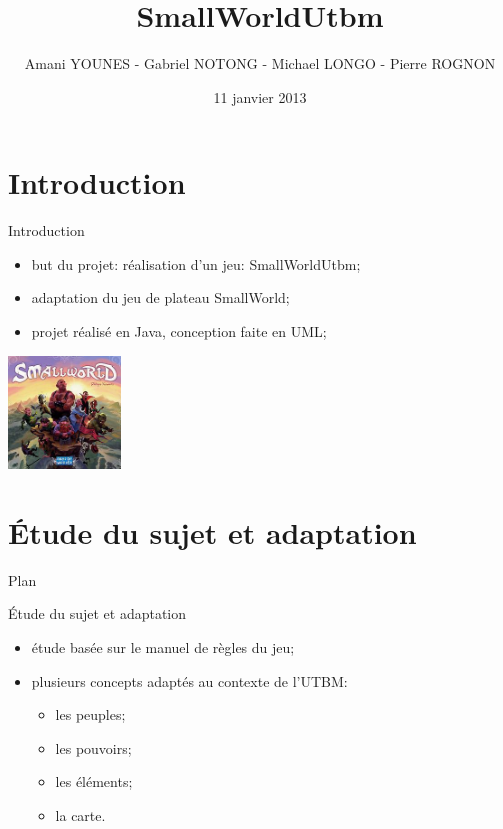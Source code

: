 \documentclass{beamer}
\title[SWU]{SmallWorldUtbm}
\author[]{Amani YOUNES - Gabriel NOTONG - Michael LONGO - Pierre ROGNON}
\institute{Programmation orientée objet - LO43}
\date{11 janvier 2013}
\begin{document}



\begin{frame}
\titlepage
\end{frame}

\section*{Introduction}

\begin{frame}{Introduction}
	
	\begin{itemize}
		\item but du projet: réalisation d'un jeu: SmallWorldUtbm;
		\vspace*{0.3cm}
		\item adaptation du jeu de plateau SmallWorld;
		\vspace*{0.3cm}
		\item projet réalisé en Java, conception faite en UML;
		\vspace*{0.3cm}
	\end{itemize}
	
	\begin{center}
		\includegraphics[width=3cm]{smallworld.jpg}
	\end{center}
\end{frame}

\section{Étude du sujet et adaptation}

\begin{frame}{Plan}

	\tableofcontents

\end{frame}

\begin{frame}{Étude du sujet et adaptation}

	\begin{itemize}
		\item étude basée sur le manuel de règles du jeu;
		\vspace*{0.5cm}
		\item plusieurs concepts adaptés au contexte de l'UTBM:
		\begin{itemize}
			\item les peuples;
			\item les pouvoirs;
			\item les éléments;
			\item la carte.
		\end{itemize}
	\end{itemize}

\end{frame}
\end{document}
